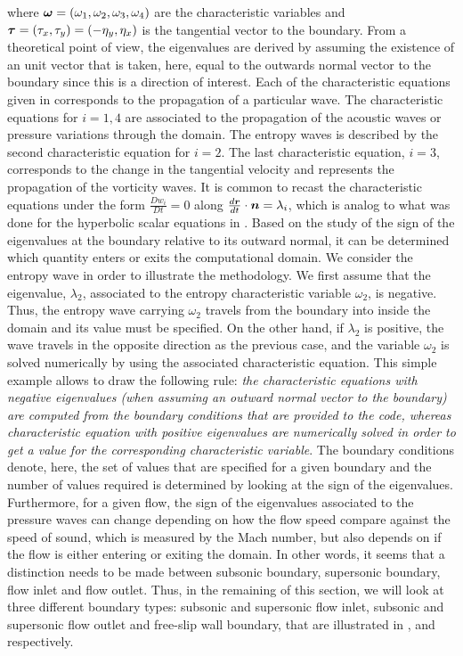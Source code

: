 %
where $\boldsymbol\omega = \left( \omega_1, \omega_2, \omega_3, \omega_4 \right)$ are the characteristic variables and $\boldsymbol\tau = \left( \tau_x, \tau_y \right) = \left( -\eta_y, \eta_x \right)$ is the tangential vector to the boundary. From a theoretical point of view, the eigenvalues are derived by assuming the existence of an unit vector that is taken, here, equal to the outwards normal vector to the boundary since this is a direction of interest. Each of the characteristic equations given in  corresponds to the propagation of a particular wave. The characteristic equations for $i=1,4$ are associated to the propagation of the acoustic waves or pressure variations through the domain. The entropy waves is described by the second characteristic equation for $i=2$. The last characteristic equation, $i=3$, corresponds to the change in the tangential velocity and represents the propagation of the vorticity waves. It is common to recast the characteristic equations under the form $\frac{D w_i}{Dt} = 0$ along $\frac{d\boldsymbol r}{dt} \cdot \boldsymbol n = \lambda_i$, which is analog to what was done for the hyperbolic scalar equations in . Based on the study of the sign of the eigenvalues at the boundary relative to its outward normal, it can be determined which quantity enters or exits the computational domain. We consider the entropy wave in order to illustrate the methodology. We first assume that the eigenvalue, $\lambda_2$, associated to the entropy characteristic variable $\omega_2$, is negative. Thus, the entropy wave carrying $\omega_2$ travels from the boundary into inside the domain and its value must be specified. On the other hand, if $\lambda_2$ is positive, the wave travels in the opposite direction as the previous case, and the variable $\omega_2$ is solved numerically by using the associated characteristic equation. This simple example allows to draw the following rule: \emph{the characteristic equations with negative eigenvalues (when assuming an outward normal vector to the boundary) are computed from the boundary conditions that are provided to the code, whereas characteristic equation with positive eigenvalues are numerically solved in order to get a value for the corresponding characteristic variable}. The boundary conditions denote, here, the set of values that are specified for a given boundary and the number of values required is determined by looking at the sign of the eigenvalues. Furthermore, for a given flow, the sign of the eigenvalues associated to the pressure waves can change depending on how the flow speed compare against the speed of sound, which is measured by the Mach number, but also depends on if the flow is either entering or exiting the domain. In other words, it seems that a distinction needs to be made between subsonic boundary, supersonic boundary, flow inlet and flow outlet. Thus, in the remaining of this section, we will look at three different boundary types: subsonic and supersonic flow inlet, subsonic and supersonic flow outlet and free-slip wall boundary, that are illustrated in ,  and  respectively.  
